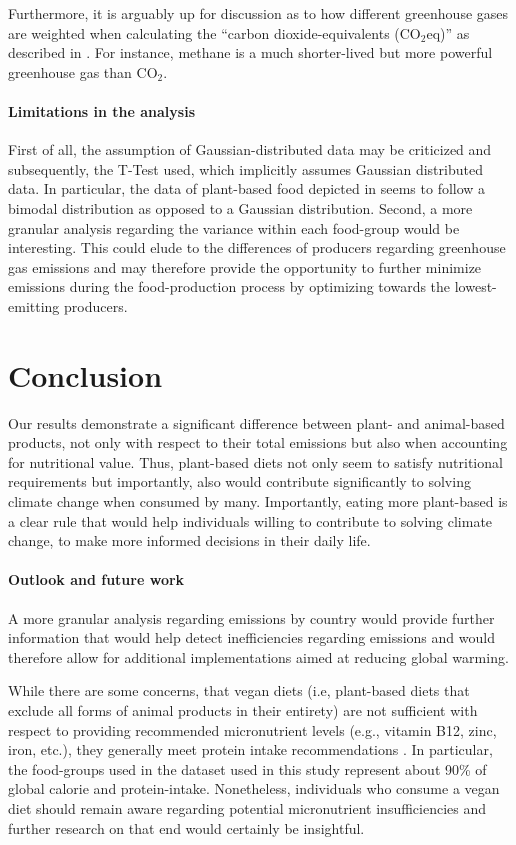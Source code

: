 \documentclass{article}
\begin{document}
Furthermore, it is arguably up for discussion as to how different greenhouse gases are weighted  when calculating the ``carbon dioxide-equivalents (CO$_{2}$eq)'' as described in  . For instance, methane is a much shorter-lived but more powerful greenhouse gas than CO$_{2}$.




\paragraph*{Limitations in the analysis}
First of all, the assumption of Gaussian-distributed data may be criticized and subsequently, the T-Test used, which implicitly assumes Gaussian distributed data.
In particular, the data of plant-based food depicted in  seems to follow a bimodal distribution as opposed to a Gaussian distribution.
Second, a more granular analysis regarding the variance within each food-group would be interesting. This could elude to the differences of producers regarding greenhouse gas emissions and may therefore provide the opportunity to further minimize emissions during the food-production process by optimizing towards the lowest-emitting producers. 


\section{Conclusion}
\label{sec:conclusion}
Our results demonstrate a significant difference between plant- and animal-based products, not only with respect to their total emissions but also when accounting for nutritional value. Thus, plant-based diets not only seem to satisfy nutritional requirements \cite{WHO2021} but importantly, also would contribute significantly to solving climate change when consumed by many. Importantly, eating more plant-based is a clear rule that would help individuals willing to contribute to solving climate change, to make more informed decisions in their daily life. 

\paragraph*{Outlook and future work}
A more granular analysis regarding emissions by country would provide further information that would help detect inefficiencies regarding emissions and would therefore allow for additional implementations aimed at reducing global warming.

While there are some concerns, that vegan diets (i.e, plant-based diets that exclude all forms of animal products in their entirety) are not sufficient with respect to providing recommended micronutrient levels (e.g., vitamin B12, zinc, iron, etc.), they generally meet protein intake recommendations \cite{WHO2021}. In particular, the food-groups  used in the dataset used in this study represent   about 90\% of global calorie and protein-intake. Nonetheless, individuals who consume a vegan diet should remain aware regarding potential micronutrient insufficiencies and further research on that end would certainly be insightful.

  
{\small


}
\end{document}

